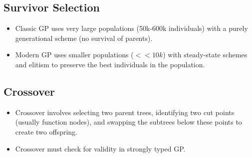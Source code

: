 \subsection*{Survivor Selection}
\begin{itemize}
    \item  Classic GP uses very large populations (50k-600k individuals) with a purely generational scheme (no survival of parents).
   \item Modern GP uses smaller populations ($<< 10k$) with steady-state schemes and elitism to preserve the best individuals in the population.
\end{itemize}

\subsection*{Crossover}
\begin{itemize}
   \item Crossover involves selecting two parent trees, identifying two cut points (usually function nodes), and swapping the subtrees below these points to create two offspring.
   \item Crossover must check for validity in strongly typed GP.
\end{itemize}

